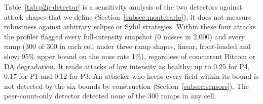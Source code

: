 Table~\ref{tab:p2p-detector} is a sensitivity analysis of the two detectors
against attack shapes that we define (Section~\ref{subsec:montecarlo}); it does
not measure robustness against arbitrary eclipse or Sybil strategies. Within
these four attacks the profiler flagged every full-intensity snapshot (0 misses
in 2{,}000) and every ramp (300 of 300 in each cell under three ramp shapes,
linear, front-loaded and slow; 95\% upper bound on the miss rate 1\%),
regardless of concurrent Bitcoin or DA degradation. It reads attacks of low
intensity as healthy: up to 0.25 for P4, 0.17 for P1 and 0.12 for P3. An
attacker who keeps every field within its bound is not detected by the six bounds
by construction (Section~\ref{subsec:sensors}). The peer-count-only detector
detected none of the 300 ramps in any cell.

